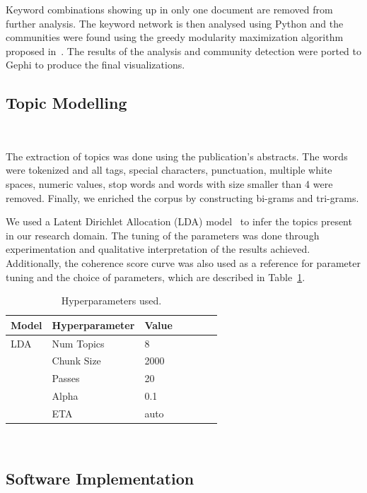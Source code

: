 Keyword combinations showing up in only one document are removed from further
analysis. The keyword network is then analysed using Python and the
communities were found using the greedy modularity maximization algorithm
proposed in~\cite{Clauset2004}. The results of the analysis and community
detection were ported to Gephi to produce the final visualizations.

\subsection{Topic Modelling}~\label{sec:topic_modelling-aug}

The extraction of topics was done using the publication's abstracts. The words
were tokenized and all tags, special characters, punctuation, multiple white
spaces, numeric values, stop words and words with size smaller than 4 were
removed. Finally, we enriched the corpus by constructing bi-grams and
tri-grams.

We used a Latent Dirichlet Allocation (LDA) model~\cite{Pritchard2000} to
infer the topics present in our research domain. The tuning of the parameters
was done through experimentation and qualitative interpretation of the results
achieved. Additionally, the coherence score curve was also used as a reference for
parameter tuning and the choice of parameters, which are described in
Table~\ref{tab:hyperparameters}. 

\begin{table}[ht]
    \begin{center}
    \begin{tabular*}{.5\textwidth}{@{\extracolsep{\fill}}lllllll@{\extracolsep{\fill}}}
        \toprule
        Model   &   Hyperparameter  &   Value \\
        \midrule
        LDA     &   Num Topics      &   8     \\
                &   Chunk Size      &   2000  \\
                &   Passes          &   20    \\
                &   Alpha           &   0.1   \\
                &   ETA             &   auto  \\
        \bottomrule
    \end{tabular*}
    \caption{Hyperparameters used.}~\label{tab:hyperparameters}
    \end{center}
\end{table}

\subsection{Software Implementation}~\label{sec:software_implementation-aug}

